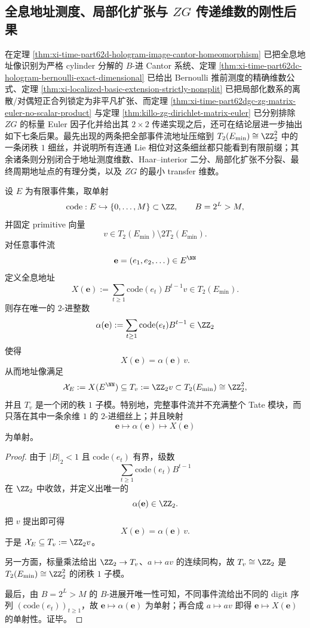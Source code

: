 \subsection{全息地址测度、局部化扩张与 \texorpdfstring{$ZG$}{ZG} 传递维数的刚性后果}\label{subsec:conclusion-holographic-localized-zg-rigidity}
在定理 \ref{thm:xi-time-part62d-hologram-image-cantor-homeomorphism} 已把全息地址像识别为严格 cylinder 分解的 \(B\)-进 Cantor 系统、定理 \ref{thm:xi-time-part62dc-hologram-bernoulli-exact-dimensional} 已给出 Bernoulli 推前测度的精确维数公式、定理 \ref{thm:xi-localized-basic-extension-strictly-nonsplit} 已把局部化数系的离散/对偶短正合列锁定为非平凡扩张、而定理 \ref{thm:xi-time-part62dgc-zg-matrix-euler-no-scalar-product} 与定理 \ref{thm:killo-zg-dirichlet-matrix-euler} 已分别排除 \(ZG\) 的标量 Euler 因子化并给出其 \(2\times 2\) 传递实现之后，还可在结论层进一步抽出如下七条后果。最先出现的两条把全部事件流地址压缩到 \(T_2(E_{\min})\cong \ZZ_2^2\) 中的一条闭秩 \(1\) 细丝，并说明所有连通 Lie 相位对这条细丝都只能看到有限前缀；其余诸条则分别闭合于地址测度维数、Haar--interior 二分、局部化扩张不分裂、最终周期地址点的有理分类，以及 \(ZG\) 的最小 transfer 维数。

\begin{theorem}\label{thm:conclusion-godel-dyadic-tate-filament}
设 \(E\) 为有限事件集，取单射
\[
\mathrm{code}:E\hookrightarrow \{0,\dots,M\}\subset \ZZ,
\qquad
B=2^L>M,
\]
并固定 primitive 向量
\[
v\in T_2(E_{\min})\setminus 2T_2(E_{\min}).
\]
对任意事件流
\[
\mathbf e=(e_1,e_2,\dots)\in E^{\NN}
\]
定义全息地址
\[
X(\mathbf e):=\sum_{t\ge 1}\mathrm{code}(e_t)B^{t-1}v\in T_2(E_{\min}).
\]
则存在唯一的 \(2\)-进整数
\[
\alpha(\mathbf e):=\sum_{t\ge 1}\mathrm{code}(e_t)B^{t-1}\in \ZZ_2
\]
使得
\[
X(\mathbf e)=\alpha(\mathbf e)\,v.
\]
从而地址像满足
\[
\mathcal X_E:=X(E^{\NN})
\subseteq
T_v:=\ZZ_2v
\subset T_2(E_{\min})\cong \ZZ_2^2,
\]
并且 \(T_v\) 是一个闭的秩 \(1\) 子模。特别地，完整事件流并不充满整个 Tate 模块，而只落在其中一条余维 \(1\) 的 \(2\)-进细丝上；并且映射
\[
\mathbf e\longmapsto \alpha(\mathbf e)\longmapsto X(\mathbf e)
\]
为单射。
\end{theorem}
\begin{proof}
由于 \(|B|_2<1\) 且 \(\mathrm{code}(e_t)\) 有界，级数
\[
\sum_{t\ge 1}\mathrm{code}(e_t)B^{t-1}
\]
在 \(\ZZ_2\) 中收敛，并定义出唯一的
\[
\alpha(\mathbf e)\in \ZZ_2.
\]
把 \(v\) 提出即可得
\[
X(\mathbf e)=\alpha(\mathbf e)\,v.
\]
于是 \(\mathcal X_E\subseteq T_v:=\ZZ_2v\)。

另一方面，标量乘法给出 \(\ZZ_2\to T_v\)、\(a\mapsto av\) 的连续同构，故 \(T_v\cong \ZZ_2\) 是 \(T_2(E_{\min})\cong \ZZ_2^2\) 的闭秩 \(1\) 子模。

最后，由 \(B=2^L>M\) 的 \(B\)-进展开唯一性可知，不同事件流给出不同的 digit 序列 \((\mathrm{code}(e_t))_{t\ge 1}\)，故 \(\mathbf e\mapsto \alpha(\mathbf e)\) 为单射；再合成 \(a\mapsto av\) 即得 \(\mathbf e\mapsto X(\mathbf e)\) 的单射性。证毕。
\end{proof}

